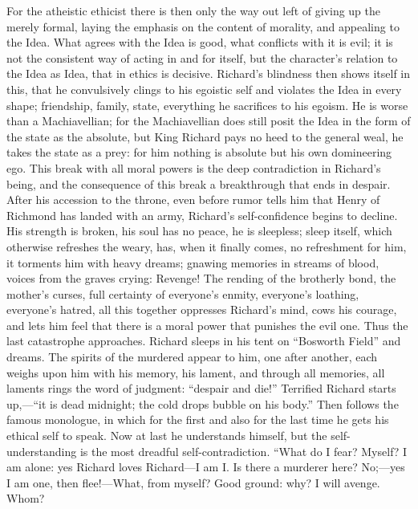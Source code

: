 \documentclass[12pt,a4paper,openany]{book}
\newcommand{\opage}[1]{\marginnote{\footnotesize\textit{[#1]}}}
\begin{document}
For the atheistic ethicist there is then only the way out
left of giving up the merely formal, laying the emphasis
on the content of morality, and appealing to the Idea.
What agrees with the Idea is good, what conflicts
with it is evil; it is not the consistent way of acting
in and for itself, but the character's relation to the Idea
as Idea, that in ethics is decisive. Richard's blindness
then shows itself in this, that he convulsively clings to
\setcounter{footnote}{0}%
\opage{544}his egoistic self and violates the Idea in every shape;
friendship, family, state, everything he sacrifices to his
egoism. He is worse than a Machiavellian; for
the Machiavellian does still posit the Idea in the form of the state as
the absolute, but King Richard pays no heed to the general
weal, he takes the state as a prey: for him nothing is
absolute but his own domineering ego. This break
with all moral powers is the deep contradiction in
Richard's being, and the consequence of this break a
breakthrough that ends in despair. After his accession to the throne,
even before rumor tells him that Henry
of Richmond has landed with an army, Richard's self-confidence
begins to decline. His strength is
broken, his soul has no peace, he is sleepless; sleep
itself, which otherwise refreshes the weary, has, when
it finally comes, no refreshment for him, it
torments him with heavy dreams; gnawing memories
in streams of blood, voices from the graves crying: Revenge!
The rending of the brotherly bond, the mother's curses,
full certainty of everyone's enmity, everyone's loathing, everyone's
hatred, all this together oppresses Richard's mind, cows his
courage, and lets him feel that there is a moral power that
punishes the evil one. Thus the last catastrophe approaches.
Richard sleeps in his tent on ``Bosworth
Field'' and dreams. The spirits of the murdered appear to
him, one after another, each weighs upon him with his
memory, his lament, and through all memories, all laments
rings the word of judgment: ``despair and die!'' Terrified Richard
starts up,---``it is dead midnight; the cold drops
bubble on his body.'' Then follows the famous monologue,
in which for the first and also for the last time he
\setcounter{footnote}{0}%
\opage{545}gets his ethical self to speak. Now at last he understands
himself, but the self-understanding is the most dreadful
self-contradiction. ``What do I fear? Myself? I am
alone: yes Richard loves Richard---I am I. Is there
a murderer here? No;---yes I am one, then flee!---What, from
myself? Good ground: why? I will avenge. Whom?
\end{document}
